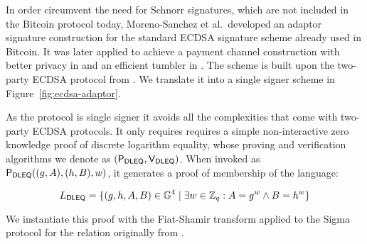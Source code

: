 \documentclass[fullpage]{article}
\theoremstyle{definition}
\newcommand{\G}{\mathbb{G}}
\begin{document}
\newcommand{\Pdleq}{\pcalgostyle{P}_{\textsf{DLEQ}}}
\newcommand{\Vdleq}{\pcalgostyle{V}_{\textsf{DLEQ}}}

In order circumvent the need for Schnorr signatures, which are not included in the Bitcoin protocol today, Moreno-Sanchez et al.\  developed an adaptor signature construction for the standard ECDSA signature scheme already used in Bitcoin\cite{ecdsa-scriptless-scripts}. It was later applied to achieve a payment channel construction with better privacy in \cite{cryptoeprint:2018:472} and an efficient tumbler in \cite{cryptoeprint:2019:589}. The scheme is built upon the two-party ECDSA protocol from \cite{Lindell2pECDSA}. We translate it into a single signer scheme in Figure~\ref{fig:ecdsa-adaptor}.

As the protocol is single signer it avoids all the complexities that come with two-party ECDSA protocols. It only requires requires a simple non-interactive zero knowledge proof of discrete logarithm equality, whose proving and verification algorithms we denote as $(\Pdleq,\Vdleq)$. When invoked as $\Pdleq((g, A),(h,B),w)$, it generates a proof of membership of the language:

\newcommand{\DLEQ}{\textsf{DLEQ}\xspace}
\[ L_{\DLEQ} = \{ (g, h, A, B) \in \G^4 \mid  \exists w \in \ZZ_q : A = g^w \land B = h^w \} \]

We instantiate this proof with the Fiat-Shamir transform applied to the Sigma protocol for the relation originally from \cite{dleq-proof}.

\newcommand{\Rx}{R_\texttt{x}}
\newcommand{\hatRx}{\hat{R}_\texttt{x}}
\newcommand{\xcoord}{f}
\end{document}
